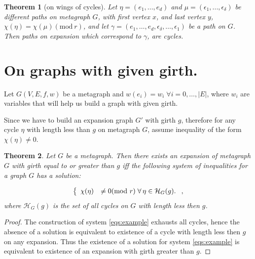 \documentclass[leqno]{aadmbook}
\newtheorem{theorem}{Theorem}
\renewcommand{\mod}[1]{\textrm{mod}\ #1}
\begin{document}
\begin{theorem}[on wings of cycles]\label{theorem_wings}
    Let $\eta = (e_1, ..., e_d)$ and $\mu = (\epsilon_1, ..., \epsilon_{\delta})$ be different paths on metagraph $G$, with first vertex $x$, and last vertex $y$, $\chi(\eta) = \chi(\mu) (\mod{r})$, and let $\gamma = (e_1, \dots, e_d, \epsilon_{\delta}, \dots, \epsilon_1)$ be a path on $G$. Then paths on expansion which correspond to $\gamma$, are cycles.
\end{theorem}

\section{On graphs with given girth.}


Let $G(V, E, f, w)$ be a metagraph and $w(e_i) = w_i \; \forall i = 0, \dots, |E|$, where $w_i$ are variables that will help us build a graph with given girth.


Since we have to build an expansion graph $G'$ with girth $g$, therefore for any cycle $\eta$ with length less than $g$ on metagraph $G$, assume inequality of the form $\chi(\eta) \neq 0$.

\begin{theorem}

Let $G$ be a metagraph. Then there exists an expansion of metagraph $G$ with girth equal to or greater than $g$ iff the following system of inequalities for a graph $G$ has a solution:

\begin{equation}
    \centering
    \left\{
        \begin{array}{ll}
            \chi(\eta) &\neq 0 (\mod{r}) \; \forall \, \eta \in \mathcal{H}_G(g).
        \end{array}
    \right.,
    \label{eqs:example}
\end{equation}
where $\mathcal{H}_G(g)$ is the set of all cycles on $G$ with length less then $g$.

\end{theorem}

\begin{proof}
    The construction of system \eqref{eqs:example} exhausts all cycles, hence the absence of a solution is equivalent to existence of a cycle with length less then $g$ on any expansion. Thus the existence of a solution for system \eqref{eqs:example} is equivalent to existence of an expansion with girth greater than $g$.
\end{proof}
\end{document}
